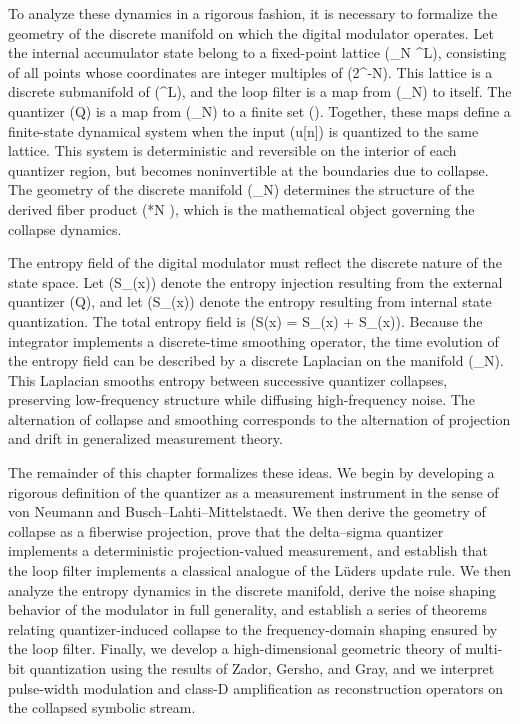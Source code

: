 To analyze these dynamics in a rigorous fashion, it is necessary to formalize the geometry of the discrete manifold on which the digital modulator operates. Let the internal accumulator state belong to a fixed-point lattice (_N \subset {}^L), consisting of all points whose coordinates are integer multiples of (2^{-N}). This lattice is a discrete submanifold of (^L), and the loop filter is a map from (_N) to itself. The quantizer (Q) is a map from (_N) to a finite set (\Lambda). Together, these maps define a finite-state dynamical system when the input (u[n]) is quantized to the same lattice. This system is deterministic and reversible on the interior of each quantizer region, but becomes noninvertible at the boundaries due to collapse. The geometry of the discrete manifold (_N) determines the structure of the derived fiber product (*N  \Lambda), which is the mathematical object governing the collapse dynamics.

The entropy field of the digital modulator must reflect the discrete nature of the state space. Let (S_{}(x)) denote the entropy injection resulting from the external quantizer (Q), and let (S_{}(x)) denote the entropy resulting from internal state quantization. The total entropy field is (S(x) = S_{}(x) + S_{}(x)). Because the integrator implements a discrete-time smoothing operator, the time evolution of the entropy field can be described by a discrete Laplacian on the manifold (_N). This Laplacian smooths entropy between successive quantizer collapses, preserving low-frequency structure while diffusing high-frequency noise. The alternation of collapse and smoothing corresponds to the alternation of projection and drift in generalized measurement theory.

The remainder of this chapter formalizes these ideas. We begin by developing a rigorous definition of the quantizer as a measurement instrument in the sense of von Neumann and Busch–Lahti–Mittelstaedt. We then derive the geometry of collapse as a fiberwise projection, prove that the delta--sigma quantizer implements a deterministic projection-valued measurement, and establish that the loop filter implements a classical analogue of the Lüders update rule. We then analyze the entropy dynamics in the discrete manifold, derive the noise shaping behavior of the modulator in full generality, and establish a series of theorems relating quantizer-induced collapse to the frequency-domain shaping ensured by the loop filter. Finally, we develop a high-dimensional geometric theory of multi-bit quantization using the results of Zador, Gersho, and Gray, and we interpret pulse-width modulation and class-D amplification as reconstruction operators on the collapsed symbolic stream.

